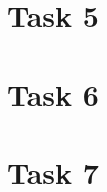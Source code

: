 \documentclass[11pt]{article}
\begin{document}
\section{Task 5}

\section{Task 6}

\section{Task 7}




\end{document}
